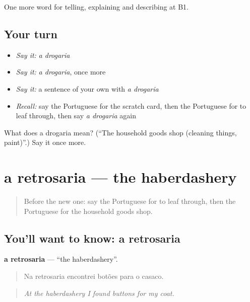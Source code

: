 \begin{grammarlens}[title={What you've built}]
One more word for telling, explaining and describing at B1.
\end{grammarlens}

\subsection*{Your turn}
\begin{itemize}
\raggedright
  \item \emph{Say it:} \emph{a drogaria}
  \item \emph{Say it:} \emph{a drogaria}, once more
  \item \emph{Say it:} a sentence of your own with \emph{a drogaria}
  \item \emph{Recall:} say the Portuguese for the scratch card, then the Portuguese for to leaf through, then say \emph{a drogaria} again
\end{itemize}

\begin{tcolorbox}[breakable,colback=teal!4,colframe=teal!35!black,title={Before you move on}]
What does a drogaria mean? (\textquotedblleft{}The household goods shop (cleaning things, paint)\textquotedblright{}.) Say it once more.
\end{tcolorbox}
\section[a retrosaria]{a retrosaria — the haberdashery}

\label{lesson:PT-C449-retrosaria}



\begin{quote}
Before the new one: say the Portuguese for to leaf through, then the Portuguese for the household goods shop.
\end{quote}

\subsection*{You'll want to know: a retrosaria}
\textbf{a retrosaria} — \textquotedblleft{}the haberdashery\textquotedblright{}.

\begin{quote}
Na retrosaria encontrei botões para o casaco.
\end{quote}

\begin{quote}
\emph{At the haberdashery I found buttons for my coat.}
\end{quote}

